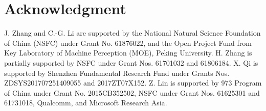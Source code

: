 \documentclass[10pt,twocolumn,letterpaper]{article}
\begin{document}
\section*{Acknowledgment} J. Zhang and C.-G. Li are supported by the National Natural Science Foundation of China (NSFC) under Grant No. 61876022, and the Open Project Fund from Key Laboratory of Machine Perception (MOE), Peking University. H. Zhang is partially supported by NSFC under Grant Nos. 61701032 and 61806184. X. Qi is supported by Shenzhen Fundamental Research Fund under Grants Nos. ZDSYS201707251409055 and 2017ZT07X152. Z. Lin is supported by 973 Program of China under Grant No. 2015CB352502, NSFC under Grant Nos. 61625301 and 61731018, Qualcomm, and Microsoft Research Asia.






\small
  
\end{document}

